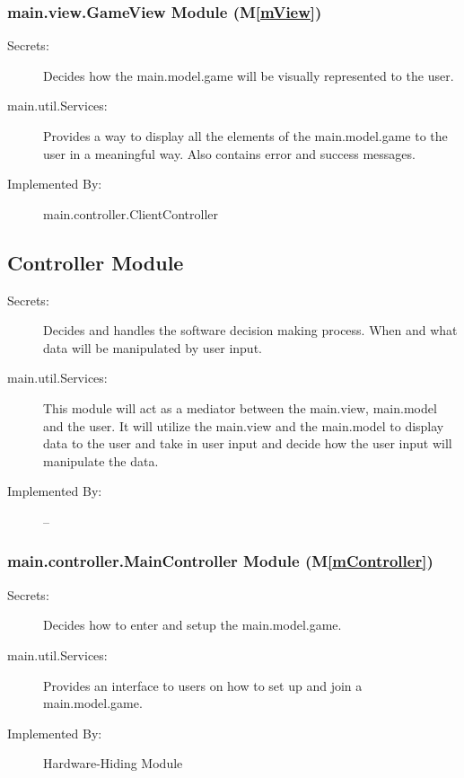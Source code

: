 \documentclass[12pt, titlepage]{article}
\newcommand{\mref}[1]{M\ref{#1}}
\begin{document}
\subsubsection{ main.view.GameView Module (\mref{mView})}
    \begin{description}
    \item[Secrets:] Decides how the main.model.game will be visually represented to the user.
    \item[main.util.Services:] Provides a way to display all the elements of the main.model.game to the user in a meaningful way. Also contains error and success messages.
    \item[Implemented By:] main.controller.ClientController
    \end{description}


\subsection{Controller Module}

\begin{description}
\item[Secrets:] Decides and handles the software decision making process. When and what data will be manipulated by user input.
\item[main.util.Services:] This module will act as a mediator between the main.view, main.model and the user. It will utilize the main.view and the main.model to display data to the user and take in user input and decide how the user input will manipulate the data.
\item[Implemented By:] --
\end{description}

\subsubsection{ main.controller.MainController Module (\mref{mController})}
    \begin{description}
    \item[Secrets:] Decides how to enter and setup the main.model.game.
    \item[main.util.Services:] Provides an interface to users on how to set up and join a main.model.game.
    \item[Implemented By:] Hardware-Hiding Module
    \end{description}
\end{document}
